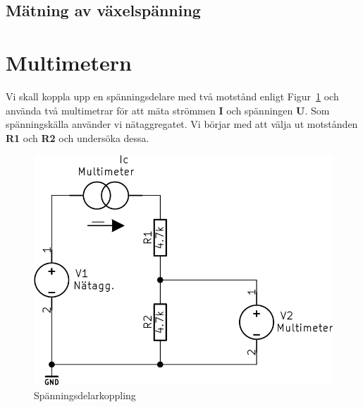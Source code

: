 \documentclass[11pt,a4paper]{article}
\begin{document}
\subsection{Mätning av växelspänning}\label{meas_ac}

\section{Multimetern}\label{}
Vi skall koppla upp en spänningsdelare med två motstånd enligt 
Figur~\ref{fig:2-mm-schem} och använda två multimetrar för att mäta strömmen 
\textbf{I} och spänningen \textbf{U}. Som spänningskälla använder vi 
nätaggregatet. Vi börjar med att välja ut motstånden \textbf{R1} och \textbf{R2}
och undersöka dessa.

\begin{figure}[htbp]
    \centering
        \includegraphics[scale=0.5]{kicad/2-multimeter-schema.png}
    \caption{Spänningsdelarkoppling}
    \label{fig:2-mm-schem}
\end{figure}
\end{document}
